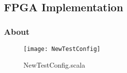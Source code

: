 
\subsection{FPGA Implementation}


\subsubsection{About}



\begin{figure}[H]
  \centering
  \texttt{[image: NewTestConfig]}
  \caption[]{NewTestConfig.scala}
  \label{fig:newtestconfig}
\end{figure}

